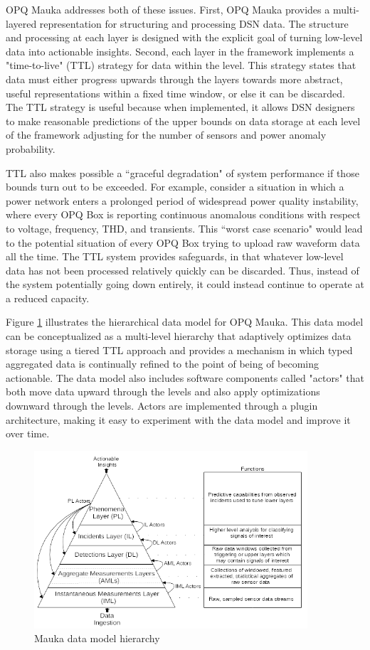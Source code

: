 OPQ Mauka addresses both of these issues. First, OPQ Mauka provides a multi-layered representation for structuring and processing DSN data. The structure and processing at each layer is designed with the explicit goal of turning low-level data into actionable insights. Second, each layer in the framework implements a "time-to-live" (TTL) strategy for data within the level. This strategy states that data must either progress upwards through the layers towards more abstract, useful representations within a fixed time window, or else it can be discarded. The TTL strategy is useful because when implemented, it allows DSN designers to make reasonable predictions of the upper bounds on data storage at each level of the framework adjusting for the number of sensors and power anomaly probability.

 TTL also makes possible a ``graceful degradation" of system performance if those bounds turn out to be exceeded. For example, consider a situation in which a power network enters a prolonged period of widespread power quality instability, where every OPQ Box is reporting continuous anomalous conditions with respect to voltage, frequency, THD, and transients.  This ``worst case scenario" would lead to the potential situation of every OPQ Box trying to upload raw waveform data all the time. The TTL system provides safeguards, in that whatever low-level data has not been processed relatively quickly can be discarded.  Thus, instead of the system potentially going down entirely, it could instead continue to operate at a reduced capacity.

Figure \ref{fig:mauka-data-model} illustrates the hierarchical data model for OPQ Mauka. This data model can be conceptualized as a multi-level hierarchy that adaptively optimizes data storage using a tiered TTL approach and provides a mechanism in which typed aggregated data is continually refined to the point of being of becoming actionable. The data model also includes software components called "actors" that both move data upward through the levels and also apply optimizations downward through the levels. Actors are implemented through a plugin architecture, making it easy to experiment with the data model and improve it over time.

\begin{figure}
\center \includegraphics[width=4in]{images/mauka/mauka-data-model.png}
\caption{Mauka data model hierarchy}
\label{fig:mauka-data-model}
\end{figure}

